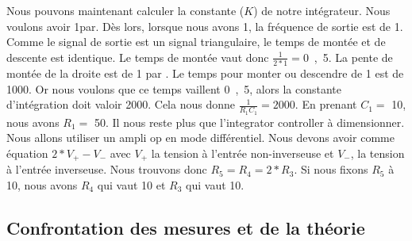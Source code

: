 Nous pouvons maintenant calculer la constante ($K$) de notre intégrateur. Nous voulons avoir \unit{1}{\milli\volt}par\unit{}{\hertz}. Dès lors, lorsque nous avons \unit{1}{\milli\volt}, la fréquence de sortie est de \unit{1}{\hertz}. Comme le signal de sortie est un signal triangulaire, le temps de montée et de descente est identique. Le temps de montée vaut donc $\frac{1}{2*1} = $\unit{0,5}{\second}. La pente de montée de la droite est de \unit{1}{\milli\volt} par \unit{}{\second}. Le temps pour monter ou descendre de \unit{1}{\volt} est de \unit{1000}{\second}. Or nous voulons que ce temps vaillent \unit{0,5}{\second}, alors la constante d'intégration doit valoir 2000. Cela nous donne $\frac{1}{R_1C_1}=2000$. En prenant $C_1=$ \unit{10}{\nano\farad}, nous avons $R_1 =$ \unit{50}{\kilo\ohm}.
Il nous reste plus que l'integrator controller à dimensionner. Nous allons utiliser un ampli op en mode différentiel. Nous devons avoir comme équation $2*V_+ - V_-$ avec $V_+$ la tension à l'entrée non-inverseuse et $V_-$, la tension à l'entrée inverseuse. Nous trouvons donc $R_5 = R_4 = 2*R_3$.
Si nous fixons $R_5$ à \unit{10}{\kilo\ohm}, nous avons $R_4$ qui vaut \unit{10}{\kilo\ohm} et $R_3$ qui vaut \unit{10}{\kilo\ohm}.

\subsection{Confrontation  des mesures et de la théorie}
